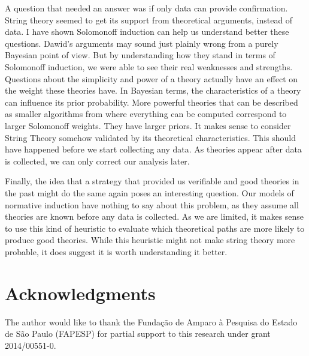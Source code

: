 \documentclass{article}
\begin{document}
	A question that needed an answer was if only data can provide confirmation. String theory seemed to get its support from theoretical arguments, instead of data. I have shown Solomonoff induction can help us understand better these questions.  Dawid's arguments \cite{dawid06a} may sound just plainly wrong from a purely Bayesian point of view. But by understanding how they stand in terms of Solomonoff induction, we were able to see their real weaknesses and strengths. Questions about the simplicity and power of a theory actually have an effect on the weight these theories have. In Bayesian terms, the characteristics of a theory can influence its prior probability. More powerful theories that can be described as smaller algorithms from where everything can be computed correspond to larger Solomonoff weights. They have larger priors. It makes sense to consider String Theory somehow validated by its theoretical characteristics. This should have happened before we start collecting any data. As theories appear after data is collected, we can only correct our analysis later. 
	
	
	
	Finally, the idea that a strategy that provided us verifiable and good theories in the past might do the same again poses an interesting question. Our models of normative induction have nothing to say about this problem, as they assume all theories are known before any data is collected. As we are limited, it makes sense to use this kind of heuristic to evaluate which theoretical paths are more likely to produce good theories. While this heuristic might not make string theory more probable, it does suggest it is worth understanding it better.
	
	
	
	
	
	
	\section*{Acknowledgments}
	The author would like to thank the Funda\c{c}\~ao de Amparo \`a Pesquisa do Estado de S\~ao Paulo (FAPESP) for partial support to this research under grant 2014/00551-0.
	
	    
	
	
	
	
	
	
\end{document}

